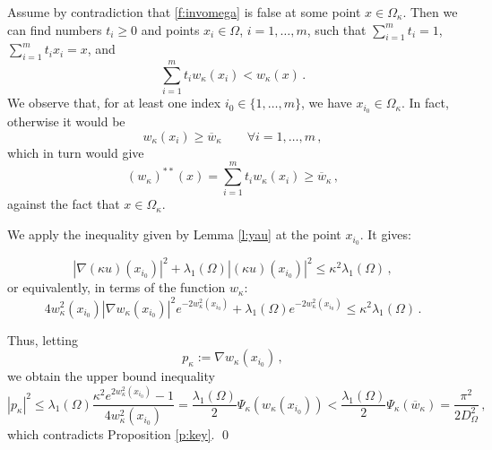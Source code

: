 \documentclass[11pt]{amsart}
\theoremstyle{definition}
\theoremstyle{remark}
\def\Om{\Omega}
\def\k{\kappa}
\begin{document}
Assume by contradiction that \eqref{f:invomega} is false at some point $x \in \Om _\k$. Then we can find numbers  $t _ i \geq 0$ and points
 $x_i \in \Om$, $i = 1, \dots, m$, such that $\sum _{i = 1} ^ m t _ i = 1$, $\sum _{i = 1} ^ m t _ i x_i = x$, and 
  $$\sum _ { i = 1} ^ m t _i w _\k ( x_i) < w _\k ( x)\,.$$ 
  We observe that, for at least one index $i _0 \in \{1, \dots, m\}$, we have  $x_{i_0}  \in \Om _\k$. 
  In fact, otherwise it would be 
  $$w _\k ( x_i ) \geq \overline w _ \k  \qquad \forall i = 1, \dots, m \,,$$ 
  which in turn would give 
  $$(w _\k   ) ^ { **} ( x) =   \sum _ { i = 1} ^ m t _i w _\k ( x_i)  \geq \overline w _ \k  \,,$$
  against the fact that $x \in \Om _ \k$. 
  
  We apply the inequality given by Lemma \ref{l:yau} at the point $x_{i_0}$.  It gives: 
  
 $$|\nabla (\k  u ) (x_{i_0} )| ^ 2 + \lambda _ 1 (\Om)  | (\k u  ) (x _{i_0} )| ^ 2 \leq \k ^ 2 \lambda _ 1  (\Om) \,,$$  
  or equivalently, in terms of the function $w _\k$: 
  $$4 w _\k ^2  (x_{i_0} )  |\nabla w _\k (x_{i_0} )| ^ 2 e ^ { - 2 w _\k  ^2 (x_{i_0} ) } + \lambda _ 1 (\Om) e ^ { - 2 w _\k  ^2 (x_{i_0} ) } \leq \k ^ 2 \lambda _ 1  (\Om) \,.$$ 
  
  Thus, letting 
  $$p _\k:=  \nabla w _\k (x_{i_0} ) \,,$$ 
  we obtain the upper bound inequality 
  $$| p_\k| ^ 2 \leq  \lambda _ 1  (\Om)  \frac{   \k ^ 2   e ^ {  2 w _\k  ^2 (x_{i_0} ) } -  1 }{  4 w _\k ^2  (x_{i_0} ) }  = \frac {\lambda _ 1 (\Om)} {2} \Psi _\k (w _\k ( x_ {i_0}) )<  \frac {\lambda _ 1 (\Om)} {2} \Psi _ \k (   \overline  w _\k ) =  \frac{\pi ^ 2}{2 D _\Om ^ 2 }  \,,$$ 
  which contradicts Proposition \ref{p:key}.  \qed
  
  
\end{document}
